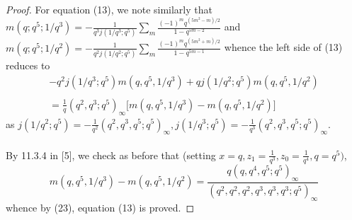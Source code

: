 \documentclass[10pt,reqno]{amsart}
\begin{document}
\begin{proof}
For equation (13), we note similarly that $m(q;q^5;1/q^3)=-\displaystyle\frac{1}{q^3j(1/q^3;q^5)}\displaystyle\sum_{m}\displaystyle\frac{(-1)^mq^{(5m^2-m)/2}}{1-q^{5m-2}}$ and $m(q;q^5;1/q^2)=-\displaystyle\frac{1}{q^2j(1/q^2;q^5)}\displaystyle\sum_{m}\displaystyle\frac{(-1)^mq^{(5m^2+m)/2}}{1-q^{5m-1}}$ whence the left side of (13) reduces to
\begin{multline}
-q^2j(1/q^3;q^5)m(q,q^5,1/q^3)+qj(1/q^2;q^5)m(q,q^5,1/q^2)\\ \\
=\displaystyle\frac{1}{q}(q^2,q^3;q^5)_{\infty}\Bigg[m(q,q^5,1/q^3)-m(q,q^5,1/q^2)\Bigg]
\end{multline}
as $j(1/q^2;q^5)=-\displaystyle\frac{1}{q^2}(q^2,q^3,q^5;q^5)_{\infty},j(1/q^3;q^5)=-\displaystyle\frac{1}{q^3}(q^2,q^3,q^5;q^5)_{\infty}.$ \\ \\
By 11.3.4 in [5], we check as before that (setting $x=q,z_1=\displaystyle\frac{1}{q^3},z_0=\displaystyle\frac{1}{q^4},q=q^5)$,
\begin{equation*}
    m(q,q^5,1/q^3)-m(q,q^5,1/q^2)=\displaystyle\frac{q(q,q^4,q^5;q^5)_{\infty}}{(q^2,q^2,q^2,q^3,q^3,q^3;q^5)_{\infty}}
\end{equation*}
whence by (23), equation (13) is proved. 
\end{proof}
\end{document}
